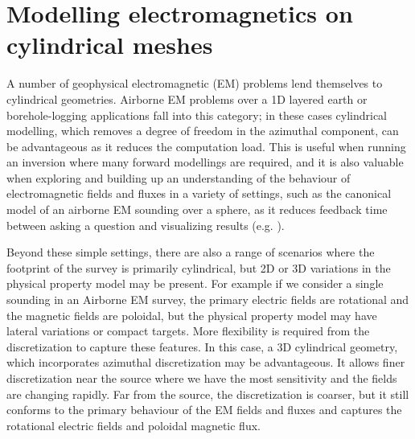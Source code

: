 
\chapter{Modelling electromagnetics on cylindrical meshes}
\label{ch:casing-software}

A number of geophysical electromagnetic (EM) problems lend themselves to cylindrical geometries. Airborne EM problems over a 1D layered earth or borehole-logging applications fall into this category; in these cases cylindrical modelling, which removes a degree of freedom in the azimuthal component, can be advantageous as it reduces the computation load. This is useful when running an inversion where many forward modellings are required, and it  is also valuable when exploring and building up an understanding of the behaviour of electromagnetic fields and fluxes in a variety of settings, such as the canonical model of an airborne EM sounding over a sphere, as it reduces feedback time between asking a question and visualizing results (e.g. \cite{Oldenburg2017}).

Beyond these simple settings, there are also a range of scenarios where the footprint of the survey is primarily cylindrical, but 2D or 3D variations in the physical property model may be present. For example if we consider a single sounding in an Airborne EM survey, the primary electric fields are rotational and the magnetic fields are poloidal, but the physical property model may have lateral variations or compact targets. More flexibility is required from the discretization to capture these features. In this case, a 3D cylindrical geometry, which incorporates azimuthal discretization may be advantageous. It allows finer discretization near the source where we have the most sensitivity and the fields are changing rapidly. Far from the source, the discretization is coarser, but it still conforms to the primary behaviour of the EM fields and fluxes and captures the rotational electric fields and poloidal magnetic flux.

